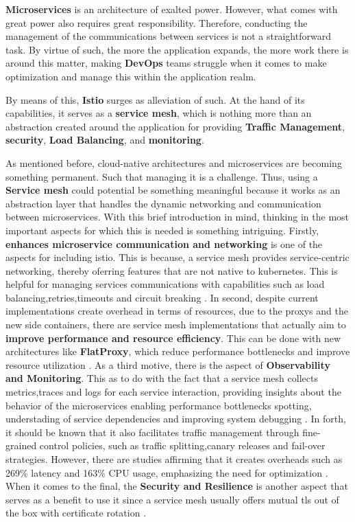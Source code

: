\textbf{Microservices} is an architecture of exalted power. However, what comes with great power also requires great responsibility. Therefore, conducting the management of the communications between services is not a straightforward task. By virtue of such, the more the application expands, the more work there is around this matter, making \textbf{DevOps} teams struggle when it comes to make optimization and manage this within the application realm.

By means of this, \textbf{Istio} surges as alleviation of such. At the hand of its capabilities, it serves as a \textbf{service mesh}, which is nothing more than an abstraction created around the application for providing \textbf{Traffic Management}, \textbf{security}, \textbf{Load Balancing}, and \textbf{monitoring}.

As mentioned before, cloud-native architectures and microservices are becoming something permanent. Such that managing it is a challenge. Thus, using a \textbf{Service mesh} could potential be something meaningful because it works as an abstraction layer that handles the dynamic networking and communication between microservices. With this brief introduction in mind, thinking in the most important aspects for which this is needed is something intriguing. Firstly, \textbf{enhances microservice communication and networking} is one of the aspects for including istio. This is because, a service mesh provides service-centric networking, thereby oferring features that are not native to kubernetes. This is helpful for managing services communications with capabilities such as load balancing,retries,timeouts and circuit breaking \cite{service-mesh-enhance-communications}. In second, despite current implementations create overhead in terms of resources, due to the proxys and the new side containers, there are service mesh implementations that actually aim to \textbf{improve performance and resource efficiency}. This can be done with new architectures like \textbf{FlatProxy}, which reduce performance bottlenecks and improve resource utilization \cite{service-mesh-flat-proxy}. As a third motive, there is the aspect of \textbf{Observability and Monitoring}. This as to do with the fact that a service mesh collects metrics,traces and logs for each service interaction, providing insights about the behavior of the microservices enabling performance bottlenecks spotting, understading of service dependencies and improving system debugging \cite{service-mesh-monitoring}. In forth, it should be known that it also facilitates traffic management through fine-grained control policies, such as traffic splitting,canary releases and fail-over strategies. However, there are studies affirming that it creates overheads such as 269\% latency and 163\% CPU usage, emphasizing the need for optimization \cite{service-mesh-traffic}. When it comes to the final, the \textbf{Security and Resilience} is another aspect that serves as a benefit to use it since a service mesh usually offers mutual tls out of the box with certificate rotation \cite{service-mesh-security}. 

